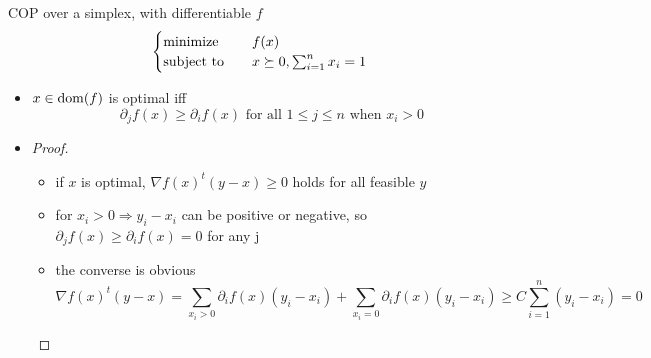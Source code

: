 \begin{remark}
    COP over a simplex, with differentiable $f$
    \[\begin{cases}
        \operatorname{minimize} \quad &f(x)\\
        \operatorname{subject\ to} \quad &x \succeq 0, \sum_{i = 1}^nx_i = 1
    \end{cases}\]
    \begin{itemize}
        \item $x \in \operatorname{dom}(f)$ is optimal iff\[\partial_jf(x) \ge \partial_if(x)\text{ for all } 1 \le j \le n \text{ when } x_i > 0\]
        \item \begin{proof}
            \begin{itemize}
                \item if $x$ is optimal, $\nabla f(x)^t(y - x) \ge 0$ holds for all feasible $y$
                \item for $x_i > 0 \Longrightarrow y_i - x_i$ can be positive or negative, so $\partial_j f(x) \ge \partial_i f(x) = 0$ for any j
                \item the converse is obvious\[\nabla f(x)^t(y - x) = \sum_{x_i > 0}\partial_i f(x)(y_i - x_i) + \sum_{x_i = 0}\partial_i f(x)(y_i - x_i) \ge C\sum_{i = 1}^n(y_i - x_i) = 0\]
            \end{itemize}
        \end{proof}
    \end{itemize}
\end{remark}

